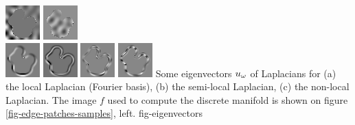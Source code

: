 \documentclass[final]{siamltex}
\begin{document}
{\includegraphics[width=0.22\linewidth]{diffusion/potatoe/potatoe-neigh-eigv-22.png}
\includegraphics[width=0.22\linewidth]{diffusion/potatoe/potatoe-neigh-eigv-25.png}\\\vspace{1mm}
\includegraphics[width=0.22\linewidth]{diffusion/potatoe/potatoe-un-normalized-eigv-3.png}
\includegraphics[width=0.22\linewidth]{diffusion/potatoe/potatoe-un-normalized-eigv-5.png}
\includegraphics[width=0.22\linewidth]{diffusion/potatoe/potatoe-un-normalized-eigv-10.png}
\includegraphics[width=0.22\linewidth]{diffusion/potatoe/potatoe-un-normalized-eigv-11.png}
}{
Some eigenvectors $u_\omega$ of Laplacians for
(a) the local Laplacian (Fourier basis),
(b) the semi-local Laplacian,
(c) the non-local Laplacian.
The image $f$ used to compute the discrete manifold is shown on figure \ref{fig-edge-patches-samples}, left.
%
}{fig-eigenvectors} 
\end{document}
